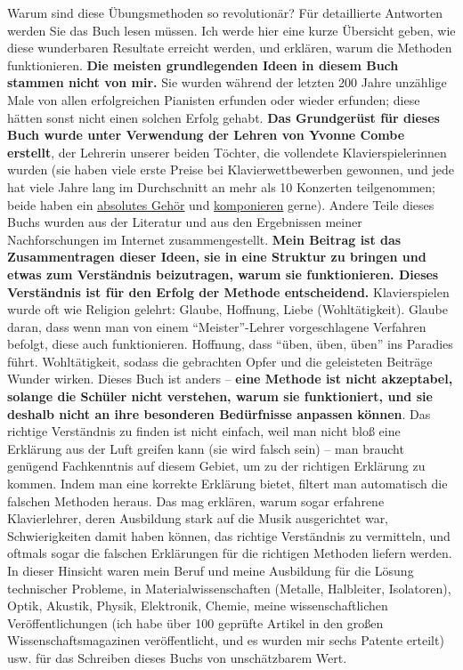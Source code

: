 Warum sind diese Übungsmethoden so revolutionär?
Für detaillierte Antworten werden Sie das Buch lesen müssen.
Ich werde hier eine kurze Übersicht geben, wie diese wunderbaren Resultate erreicht werden, und erklären, warum die Methoden funktionieren.
\textbf{Die meisten grundlegenden Ideen in diesem Buch stammen nicht von mir.}
Sie wurden während der letzten 200 Jahre unzählige Male von allen erfolgreichen Pianisten erfunden oder wieder erfunden; diese hätten sonst nicht einen solchen Erfolg gehabt.
\textbf{Das Grundgerüst für dieses Buch wurde unter Verwendung der Lehren von Yvonne Combe erstellt}, der Lehrerin unserer beiden Töchter, die vollendete Klavierspielerinnen wurden (sie haben viele erste Preise bei Klavierwettbewerben gewonnen, und jede hat viele Jahre lang im Durchschnitt an mehr als 10 Konzerten teilgenommen; beide haben ein \hyperref[c1iii12]{absolutes Gehör} und \hyperref[c1iii12blatt]{komponieren} gerne).
Andere Teile dieses Buchs wurden aus der Literatur und aus den Ergebnissen meiner Nachforschungen im Internet zusammengestellt.
\textbf{Mein Beitrag ist das Zusammentragen dieser Ideen, sie in eine Struktur zu bringen und etwas zum Verständnis beizutragen, warum sie funktionieren.
Dieses Verständnis ist für den Erfolg der Methode entscheidend.}
Klavierspielen wurde oft wie Religion gelehrt: Glaube, Hoffnung, Liebe (Wohltätigkeit).
Glaube daran, dass wenn man von einem \enquote{Meister}-Lehrer vorgeschlagene Verfahren befolgt, diese auch funktionieren.
Hoffnung, dass \enquote{üben, üben, üben} ins Paradies führt.
Wohltätigkeit, sodass die gebrachten Opfer und die geleisteten Beiträge Wunder wirken.
Dieses Buch ist anders -- \textbf{eine Methode ist nicht akzeptabel, solange die Schüler nicht verstehen, warum sie funktioniert, und sie deshalb nicht an ihre besonderen Bedürfnisse anpassen können}.
Das richtige Verständnis zu finden ist nicht einfach, weil man nicht bloß eine Erklärung aus der Luft greifen kann (sie wird falsch sein) -- man braucht genügend Fachkenntnis auf diesem Gebiet, um zu der richtigen Erklärung zu kommen.
Indem man eine korrekte Erklärung bietet, filtert man automatisch die falschen Methoden heraus.
Das mag erklären, warum sogar erfahrene Klavierlehrer, deren Ausbildung stark auf die Musik ausgerichtet war, Schwierigkeiten damit haben können, das richtige Verständnis zu vermitteln, und oftmals sogar die falschen Erklärungen für die richtigen Methoden liefern werden.
In dieser Hinsicht waren mein Beruf und meine Ausbildung für die Lösung technischer Probleme, in Materialwissenschaften (Metalle, Halbleiter, Isolatoren), Optik, Akustik, Physik, Elektronik, Chemie, meine wissenschaftlichen Veröffentlichungen (ich habe über 100 geprüfte Artikel in den großen Wissenschaftsmagazinen veröffentlicht, und es wurden mir sechs Patente erteilt) usw. für das Schreiben dieses Buchs von unschätzbarem Wert.
